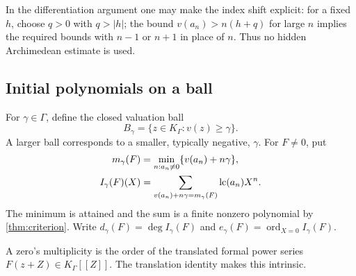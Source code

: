 \documentclass[11pt]{article}
\theoremstyle{plain}
\theoremstyle{plain}
\theoremstyle{plain}
\theoremstyle{definition}
\theoremstyle{definition}
\theoremstyle{definition}
\theoremstyle{remark}
\newcommand{\K}{K_\Gamma}\newcommand{\E}{\mathcal E_\Gamma}
\DeclareMathOperator{\ord}{ord}\DeclareMathOperator{\cf}{cf}
\begin{document}
In the differentiation argument one may make the index shift explicit:
for a fixed $h$, choose $q>0$ with $q>|h|$; the bound
$v(a_n)>n(h+q)$ for large $n$ implies the required bounds with $n-1$
or $n+1$ in place of $n$. Thus no hidden Archimedean estimate is used.

\subsection{Initial polynomials on a ball}
For $\gamma\in\Gamma$, define the closed valuation ball
\[
 B_\gamma=\{z\in\K:v(z)\ge\gamma\}.
\]
A larger ball corresponds to a smaller, typically negative,
$\gamma$. For $F\ne0$, put
\begin{align}
 m_\gamma(F)&=\min_{n:a_n\ne0}\{v(a_n)+n\gamma\},\label{eq:weighted}\\
 I_\gamma(F)(X)&=
 \sum_{v(a_n)+n\gamma=m_\gamma(F)}\operatorname{lc}(a_n)X^n.
 \label{eq:initial}
\end{align}
The minimum is attained and the sum is a finite nonzero polynomial by
\cref{thm:criterion}. Write
$d_\gamma(F)=\deg I_\gamma(F)$ and
$e_\gamma(F)=\ord_{X=0}I_\gamma(F)$.

A zero's multiplicity is the order of the translated formal power series
$F(z+Z)\in\K[[Z]]$. The translation identity makes this intrinsic.
\end{document}
